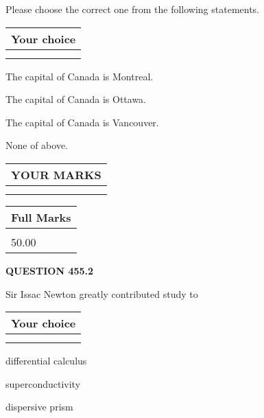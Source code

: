 \documentclass[12pt]{article}
\begin{document}
  
Please choose the correct one from the following statements.
  
  
\noindent\hspace{3.0in} \begin{tabular}{|l|}
\hline
Your choice \\
\hline
 \\ 
 \\ 
\hline
\end{tabular}
  
  
 
 
The capital of Canada is Montreal.
 
 
The capital of Canada is Ottawa.
 
 
The capital of Canada is Vancouver.
 
 
 None of above.
 
 
  
\vspace{0.2in}
  
\noindent\begin{tabular}{|l|}
\hline
 YOUR MARKS  \\
\hline
 \\ 
 \\ 
\hline
\end{tabular}
\hspace{0.05in} \begin{tabular}{|l|}
\hline
 Full Marks  \\
\hline
 \\ 
50.00 \\
\hline
\end{tabular}
{\textbf{\Large{QUESTION
455.2 
}}}
  
  
Sir Issac Newton greatly contributed study to
  
  
\noindent\hspace{3.0in} \begin{tabular}{|l|}
\hline
Your choice \\
\hline
 \\ 
 \\ 
\hline
\end{tabular}
  
  
 
 
differential calculus
 
 
superconductivity
 
 
dispersive prism
 
\end{document}
